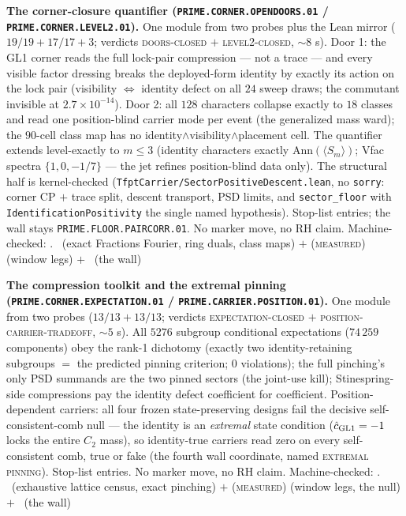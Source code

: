 \documentclass[11pt,a4paper]{article}
\theoremstyle{definition}
\begin{document}
\par\smallskip\noindent\textbf{The corner-closure quantifier
(\texttt{PRIME.CORNER.OPENDOORS.01} /
\texttt{PRIME.CORNER.LEVEL2.01}).}
One module from two probes plus the Lean mirror
($19/19 + 17/17 + 3$; verdicts \textsc{doors-closed} $+$
\textsc{level2-closed}, $\sim8$ s).  Door 1: the GL1 corner reads
the full lock-pair compression --- not a trace --- and every
visible factor dressing breaks the deployed-form identity by
exactly its action on the lock pair (visibility $\Leftrightarrow$
identity defect on all $24$ sweep draws; the commutant invisible
at $2.7\times10^{-14}$).  Door 2: all $128$ characters collapse
exactly to $18$ classes and read one position-blind carrier mode
per event (the generalized mass ward); the $90$-cell class map has
no identity$\wedge$visibility$\wedge$placement cell.  The
quantifier extends level-exactly to $m \le 3$ (identity characters
exactly $\mathrm{Ann}(\langle S_m\rangle)$; Vfac spectra
$\{1, 0, -1/7\}$ --- the jet refines position-blind data only).
The structural half is kernel-checked
(\texttt{TfptCarrier/SectorPositiveDescent.lean}, no
\texttt{sorry}: corner CP $+$ trace split, descent transport, PSD
limits, and \texttt{sector\_floor} with
\texttt{IdentificationPositivity} the single named hypothesis).
Stop-list entries; the wall stays
\texttt{PRIME.FLOOR.PAIRCORR.01}.  No marker move, no RH claim.
Machine-checked: .
\mE\ (exact Fractions Fourier, ring duals, class maps) $+$
(\textsc{measured}) (window legs) $+$ \mO\ (the wall)
\par\smallskip

\par\smallskip\noindent\textbf{The compression toolkit and the
extremal pinning (\texttt{PRIME.CORNER.EXPECTATION.01} /
\texttt{PRIME.CARRIER.POSITION.01}).}
One module from two probes ($13/13 + 13/13$; verdicts
\textsc{expectation-closed} $+$
\textsc{position-carrier-tradeoff}, $\sim5$ s).  All $5276$
subgroup conditional expectations ($74\,259$ components) obey the
rank-1 dichotomy (exactly two identity-retaining subgroups $=$
the predicted pinning criterion; $0$ violations); the full
pinching's only PSD summands are the two pinned sectors (the
joint-use kill); Stinespring-side compressions pay the identity
defect coefficient for coefficient.  Position-dependent carriers:
all four frozen state-preserving designs fail the decisive
self-consistent-comb null --- the identity is an \emph{extremal}
state condition ($\hat c_{\rm GL1} = -1$ locks the entire $C_2$
mass), so identity-true carriers read zero on every
self-consistent comb, true or fake (the fourth wall coordinate,
named \textsc{extremal pinning}).  Stop-list entries.  No marker
move, no RH claim.
Machine-checked: .
\mE\ (exhaustive lattice census, exact pinching) $+$
(\textsc{measured}) (window legs, the null) $+$ \mO\ (the wall)
\par\smallskip
\end{document}
